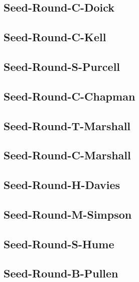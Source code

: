 \documentclass[letterpaper,10pt,english]{sphinxmanual}
\begin{document}
\subsection{Seed-Round-C-Doick}
\label{\detokenize{statements:seed-round-c-doick}}

\subsection{Seed-Round-C-Kell}
\label{\detokenize{statements:seed-round-c-kell}}

\subsection{Seed-Round-S-Purcell}
\label{\detokenize{statements:seed-round-s-purcell}}

\subsection{Seed-Round-C-Chapman}
\label{\detokenize{statements:seed-round-c-chapman}}

\subsection{Seed-Round-T-Marshall}
\label{\detokenize{statements:seed-round-t-marshall}}

\subsection{Seed-Round-C-Marshall}
\label{\detokenize{statements:seed-round-c-marshall}}

\subsection{Seed-Round-H-Davies}
\label{\detokenize{statements:seed-round-h-davies}}

\subsection{Seed-Round-M-Simpson}
\label{\detokenize{statements:seed-round-m-simpson}}

\subsection{Seed-Round-S-Hume}
\label{\detokenize{statements:seed-round-s-hume}}

\subsection{Seed-Round-B-Pullen}
\label{\detokenize{statements:seed-round-b-pullen}}
\end{document}
